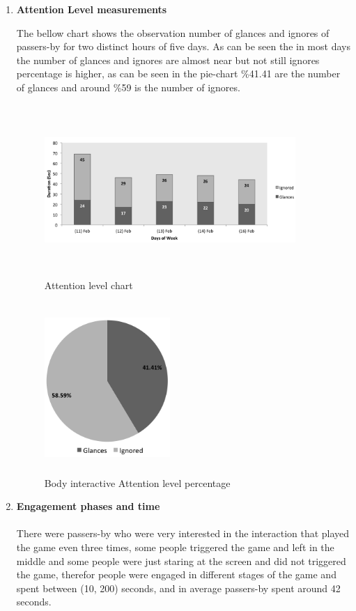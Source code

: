 \begin{enumerate}
\item \textbf{Attention Level measurements}

The bellow chart shows the observation number of glances and ignores of passers-by for two distinct hours of five days. As can be seen the in most days the number of glances and ignores are almost near but not still ignores percentage is higher, as can be seen in the pie-chart \%41.41 are the number of glances and around \%59 is the number of ignores. 
\begin{figure}[H]
    \centering
    \includegraphics[width=0.9\textwidth,height=6.5cm]{Figures/8/body_inter_findings/Body_Inter_chart}%
    \caption{Attention level chart}%
    \label{fig:bodyattentionlevelchart}%
\end{figure}


\begin{figure}[H]
    \centering
    \includegraphics[width=0.45\textwidth,height=6.5cm]{Figures/8/body_inter_findings/body_inter_percentage}
    \caption{Body interactive Attention level percentage}%
    \label{fig:bodyattentionlevelpercentage}%
\end{figure}



\item \textbf{Engagement phases and time} \\
\\
There were passers-by who were very interested in the interaction that played the game even three times, some people triggered the game and left in the middle and some people were just staring at the screen and did not triggered the game, therefor people were engaged in different stages of the game and spent between (10, 200) seconds, and in average passers-by spent around 42 seconds.


\end{enumerate}
